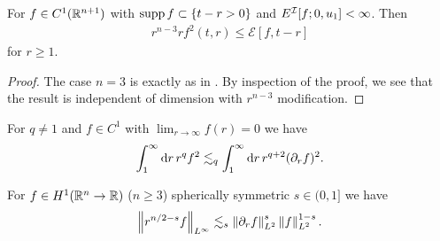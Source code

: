 \documentclass[11pt, oneside]{amsart}
\begin{document}
\begin{lemma}\label{boundedness}
	For $f\in C^{1}(\mathbb{R}^{n+1})$ with $\operatorname{supp} f\subset\{t-r>0\}$ and $E^{\mathcal{I}}[f;0,u_1]<\infty$. Then
	\begin{equation*}
		\begin{gathered}
			r^{n-3}rf^2(t,r)\leq \mathcal{E}[f,t-r]
		\end{gathered}
	\end{equation*}
	for $r\geq1$.
\end{lemma}
\begin{proof}
	The case $n=3$ is exactly as in \cite{yang_global_2013-1}. By inspection of the proof, we see that the result is independent of dimension with $r^{n-3}$ modification. 
\end{proof}

\begin{lemma}\label{hardy inequality}		
	For $q\neq1$ and $f\in C^1$ with $\lim_{r\to\infty}f(r)=0$ we have
	\begin{equation*}
		\begin{gathered}
			\int_1^\infty\mathrm{d} r\, r^qf^2\lesssim_q \int_1^\infty\mathrm{d} r\,r^{q+2}(\partial_rf)^2.
		\end{gathered}
	\end{equation*}
\end{lemma}

\begin{lemma}\label{radial Sobolev inequality}
	For $f\in H^{1}(\mathbb{R}^{n}\to\mathbb{R})$ ($n\geq3$) spherically symmetric $s\in(0,1]$ we have 
	\begin{equation*}
		\begin{gathered}
			\left\lVert r^{n/2-s}f\right\rVert_{L^\infty}\lesssim_s\left\lVert \partial_rf\right\rVert^s_{L^2}\left\lVert f\right\rVert^{1-s}_{L^2}.
		\end{gathered}
	\end{equation*}
\end{lemma}
\end{document}
